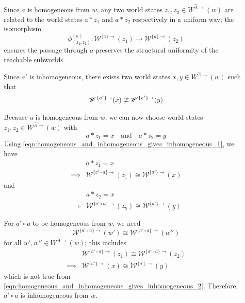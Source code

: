 \begin{proofE}
\begin{enumerate}[(1)]
    Since $a$ is homogeneous from $w$, any two world states $z_{1}, z_{2} \in W^{\hat{A}\to}(w)$ are related to the world states $a \ast z_{1}$ and $a \ast z_{2}$ respectively in a uniform way; the isomorphism
    \begin{equation}
        \phi^{(a)}_{(z_{1}, z_{2})}: \mathscr{W}^{\{a\}\to}(z_{1}) \to \mathscr{W}^{\{a\}\to}(z_{2})
    \end{equation}
    ensures the passage through $a$ preserves the structural uniformity of the reachable subworlds.

    Since $a'$ is inhomogeneous, there exists two world states $x, y \in W^{\hat{A}\to}(w)$ such that
    \begin{equation}\label{eqn:homogeneous_and_inhomogeneous_gives_inhomogeneous_2}
        \mathscr{W}^{\{a'\}\to}(x) \centernot\cong \mathscr{W}^{\{a'\}\to}(y)
    \end{equation}

    Because $a$ is homogeneous from $w$, we can now choose world states $z_{1}, z_{2} \in W^{\hat{A}\to}(w)$ with
    \begin{equation}
        a \ast z_{1} = x \quad \text{and} \quad a \ast z_{2} = y
    \end{equation}
    Using \cref{eqn:homogeneous_and_inhomogeneous_gives_inhomogeneous_1}, we have
    \begin{align}
        & a \ast z_{1} = x \\
        \implies & \mathscr{W}^{\{a' \circ a\}\to}(z_{1}) \cong \mathscr{W}^{\{a'\}\to}(x)
    \end{align}
    and
    \begin{align}
        & a \ast z_{2} = x \\
        \implies & \mathscr{W}^{\{a' \circ a\}\to}(z_{2}) \cong \mathscr{W}^{\{a'\}\to}(y)
    \end{align}

    For $a' \circ a$ to be homogeneous from $w$, we need
    \begin{equation}
        \mathscr{W}^{\{a' \circ a\}\to}(w') \cong \mathscr{W}^{\{a' \circ a\}\to}(w'') 
    \end{equation}
    for all $w',w'' \in W^{\hat{A}\to}(w)$; this includes
    \begin{align}
        & \mathscr{W}^{\{a' \circ a\}\to}(z_{1}) \cong \mathscr{W}^{\{a' \circ a\}\to}(z_{2}) \\
        \implies & \mathscr{W}^{\{a'\}\to}(x) \cong \mathscr{W}^{\{a'\}\to}(y)
    \end{align}
    which is not true from \cref{eqn:homogeneous_and_inhomogeneous_gives_inhomogeneous_2}.
    Therefore, $a' \circ a$ is inhomogeneous from $w$.



\end{enumerate}
\end{proofE}
